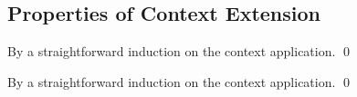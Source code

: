 \subsection{Properties of Context Extension}

\begin{lemma}[\DeclarationPreservationName]
  \label{lemma:\DeclarationPreservationName}
  \DeclarationPreservationBody
\end{lemma}
\proof

By a straightforward induction on the context application.
\qed

\begin{lemma}[\ReverseDeclarationPreservationName]
  \label{lemma:\ReverseDeclarationPreservationName}
  \ReverseDeclarationPreservationBody
\end{lemma}
\proof

By a straightforward induction on the context application.
\qed


\begin{lemma}[\DeclarationOrderPreservationName]
  \label{lemma:\DeclarationOrderPreservationName}
  \DeclarationOrderPreservationBody
\end{lemma}
\proof

